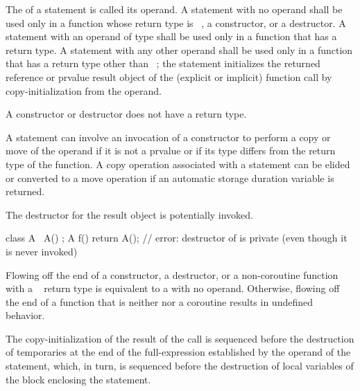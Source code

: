 \pnum
The 
of a  statement is called its operand. A  statement with
no operand shall be used only in a function whose return type is
\cv{}~, a constructor, or a
destructor.
%
%
A  statement with an operand of type  shall be used only
in a function that has a \cv{}~ return type.
A  statement with any other operand shall be used only
in a function that has a return type other than \cv{}~;
%
the  statement initializes the
returned reference or prvalue result object
of the (explicit or implicit) function call
by copy-initialization from the operand.
\begin{note}
A constructor or destructor does not have a return type.
\end{note}
\begin{note}
A  statement can involve
an invocation of a constructor to perform a copy or move of the operand
if it is not a prvalue or if its type differs from the return type of the function.
A copy operation associated with a  statement can be elided or
converted to a move operation if an automatic storage duration variable is returned.
\end{note}

\pnum
The destructor for the result object
is potentially invoked.
\begin{example}
\begin{codeblock}
class A {
  ~A() {}
};
A f() { return A(); }   // error: destructor of  is private (even though it is never invoked)
\end{codeblock}
\end{example}

\pnum
Flowing off the end of
a constructor,
a destructor, or
a non-coroutine function with a \cv{}~ return type is
equivalent to a  with no operand.
Otherwise, flowing off the end of a function
that is neither  nor a coroutine
results in undefined behavior.

\pnum
The copy-initialization of the result of the call is sequenced before the
destruction of temporaries at the end of the full-expression established
by the operand of the  statement, which, in turn, is sequenced
before the destruction of local variables of the block
enclosing the  statement.


